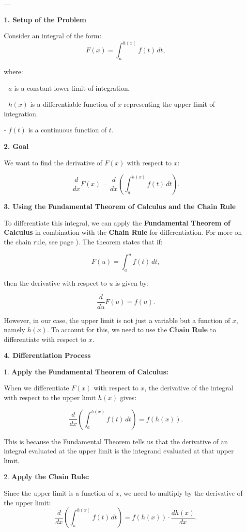 \documentclass[a4paper,12pt]{book}
\begin{document}
---

\textbf{1. Setup of the Problem}

Consider an integral of the form:
\[
F(x) = \int_{a}^{h(x)} f(t) \, dt,
\]

where:

- \( a \) is a constant lower limit of integration.

- \( h(x) \) is a differentiable function of \( x \) representing the upper limit of integration.

- \( f(t) \) is a continuous function of \( t \).

\textbf{2. Goal}

We want to find the derivative of \( F(x) \) with respect to \( x \):

\[
\dfrac{d}{dx} F(x) = \dfrac{d}{dx} \left( \int_{a}^{h(x)} f(t) \, dt \right).
\]

\textbf{3. Using the Fundamental Theorem of Calculus and the Chain Rule}

To differentiate this integral, we can apply the \textbf{Fundamental Theorem of Calculus} in combination with the \textbf{Chain Rule} for differentiation. For more on the chain rule, see page \pageref{sec:chain_rule}). The theorem states that if:

\[
F(u) = \int_{a}^{u} f(t) \, dt,
\]

then the derivative with respect to \( u \) is given by:

\[
\dfrac{d}{du} F(u) = f(u).
\]

However, in our case, the upper limit is not just a variable but a function of \( x \), namely \( h(x) \). To account for this, we need to use the \textbf{Chain Rule} to differentiate with respect to \( x \).

\textbf{4. Differentiation Process}

1. \textbf{Apply the Fundamental Theorem of Calculus:}

   When we differentiate \( F(x) \) with respect to \( x \), the derivative of the integral with respect to the upper limit \( h(x) \) gives:
   
   \[
   \dfrac{d}{dx} \left( \int_{a}^{h(x)} f(t) \, dt \right) = f(h(x)).
   \]

   This is because the Fundamental Theorem tells us that the derivative of an integral evaluated at the upper limit is the integrand evaluated at that upper limit.

2. \textbf{Apply the Chain Rule:}

   Since the upper limit is a function of \( x \), we need to multiply by the derivative of the upper limit:
   \[
   \dfrac{d}{dx} \left( \int_{a}^{h(x)} f(t) \, dt \right) = f(h(x)) \cdot \dfrac{dh(x)}{dx}.
   \]
\end{document}
